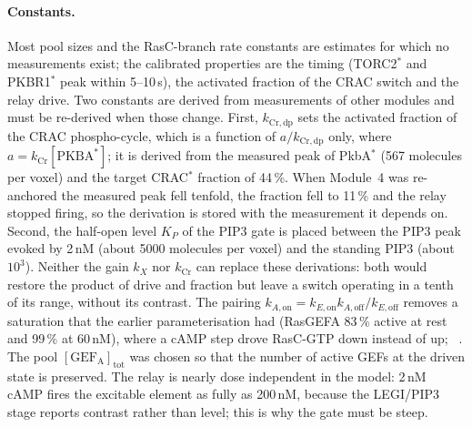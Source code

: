 \paragraph{Constants.}
Most pool sizes and the RasC-branch rate constants are estimates for which no measurements exist; the calibrated properties are the timing (TORC2$^*$ and PKBR1$^*$ peak within 5--10\,s), the activated fraction of the CRAC switch and the relay drive.
Two constants are derived from measurements of other modules and must be re-derived when those change.
First, $k_{\mathrm{Cr},\mathrm{dp}}$ sets the activated fraction of the CRAC phospho-cycle, which is a function of $a/k_{\mathrm{Cr},\mathrm{dp}}$ only, where $a=k_\mathrm{Cr}[\mathrm{PKBA}^*]$; it is derived from the measured peak of PkbA$^*$ (567 molecules per voxel) and the target CRAC$^*$ fraction of 44\,\%.
When Module~4 was re-anchored the measured peak fell tenfold, the fraction fell to 11\,\% and the relay stopped firing, so the derivation is stored with the measurement it depends on.
Second, the half-open level $K_P$ of the PIP3 gate is placed between the PIP3 peak evoked by 2\,nM (about 5000 molecules per voxel) and the standing PIP3 (about $10^3$).
Neither the gain $k_X$ nor $k_\mathrm{Cr}$ can replace these derivations: both would restore the product of drive and fraction but leave a switch operating in a tenth of its range, without its contrast.
The pairing $k_{A,\mathrm{on}}=k_{E,\mathrm{on}}k_{A,\mathrm{off}}/k_{E,\mathrm{off}}$ removes a saturation that the earlier parameterisation had (RasGEFA 83\,\% active at rest and 99\,\% at 60\,nM), where a cAMP step drove RasC-GTP down instead of up; ~\cite{kae2004}.
The pool $[\mathrm{GEF_A}]_\mathrm{tot}$ was chosen so that the number of active GEFs at the driven state is preserved.
The relay is nearly dose independent in the model: 2\,nM cAMP fires the excitable element as fully as 200\,nM, because the LEGI/PIP3 stage reports contrast rather than level; this is why the gate must be steep.
